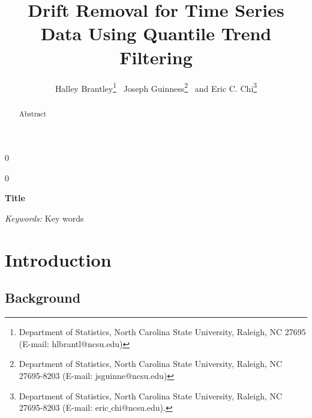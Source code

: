 \documentclass[12pt]{article}
\newcommand{\blind}{0}
\numberwithin{equation}{section}
\theoremstyle{plain}
\begin{document}
\def\spacingset#1{\renewcommand{\baselinestretch}%
	{#1}\small\normalsize} \spacingset{1}



\blind
{
	\title{\bf Drift Removal for Time Series Data Using Quantile Trend Filtering}
	\author{Halley Brantley\thanks{
			Department of Statistics, North Carolina State University, Raleigh, NC 27695 (E-mail: hlbrantl@ncsu.edu)} \,
		Joseph Guinness\thanks{
			Department of Statistics, North Carolina State University, Raleigh, NC 27695-8203 (E-mail: jsguinne@ncsu.edu)} \,
		and
		Eric C. Chi\thanks{Department of Statistics, North Carolina State University, Raleigh, NC 27695-8203 (E-mail: eric$\_$chi@ncsu.edu).}    \\}
	\date{}
	\maketitle
} \fi

\blind
{
	\bigskip
	\bigskip
	\bigskip
	\begin{center}
		{\LARGE\bf Title}
	\end{center}
	\medskip
} \fi

\bigskip
\begin{abstract}
	Abstract
\end{abstract}

\noindent%
{\it Keywords:}  Key words
\vfill

\newpage
\spacingset{1.45} %
\section{Introduction}

\subsection{Background}
\end{document}
